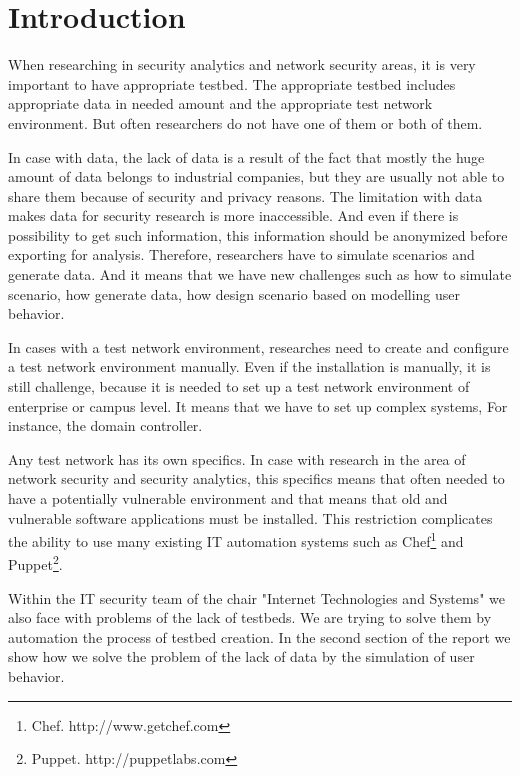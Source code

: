 \section{Introduction}


When researching in security analytics and network security areas, it is very important to have appropriate testbed. The appropriate testbed includes appropriate data in needed amount and the appropriate test network environment. But often researchers do not have one of them or both of them.  

In case with data, the lack of data is a result of the fact that mostly the huge amount of data belongs to industrial companies, but they are usually not able to share them because of security and privacy reasons. The limitation with data makes data for security research is more inaccessible. And even if there is possibility to get such information, this information should be anonymized before exporting for analysis. Therefore, researchers have to simulate scenarios  and generate data. And it means that we have new challenges such as how to simulate scenario, how generate data, how design scenario based on modelling user behavior. 

In cases with a test network environment, researches need to create and configure a test network environment manually. Even if the installation is manually, it is still challenge, because it is needed to set up a test network environment of enterprise or campus level. It means that we have to set up complex systems, For instance, the domain controller. 

Any test network has its own specifics. In case with research in the area of network security and security analytics, this specifics means that often needed to have a potentially vulnerable environment and that means that old and vulnerable software applications must be installed. This restriction complicates the ability to use many existing IT automation systems such as Chef\footnote{Chef. http://www.getchef.com} and Puppet\footnote{Puppet. http://puppetlabs.com}. %

Within the IT security team of the chair "Internet Technologies and Systems" we also face with problems of the lack of testbeds. We are trying to solve them by automation the process of testbed creation. In the second section of the report we show how we solve the problem of the lack of data by the simulation of user behavior.



